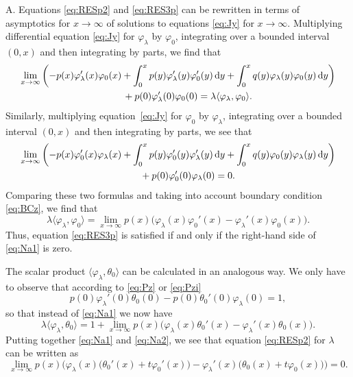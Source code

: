 \documentclass[10pt,a4paper]{amsart}
\numberwithin{equation}{section}
\begin{document}
 A. Equations \eqref{eq:RESp2} and \eqref{eq:RES3p} can be rewritten in terms of asymptotics for $x\to\infty$ of solutions to equations \eqref{eq:Jy} for $x\to\infty$.
 Multiplying differential equation \eqref{eq:Jy} for $\varphi_{\lambda}
 $ by $\varphi_{0}$, integrating over a bounded interval $(0,x)$ and then integrating by parts, we find that
 \begin{gather*}
 \lim_{x\to\infty} \bigg( {-}p(x) \varphi_{\lambda}' (x)\varphi_{0}(x)+\int_{0}^x p(y) \varphi_{\lambda}' (y)\varphi_{0}' (y)\,{\rm d}y
 +\int_{0}^x q(y) \varphi_{\lambda} (y) \varphi_{0} (y)\,{\rm d}y\bigg)
 \\
 \qquad{} + p(0) \varphi_{\lambda}' (0)\varphi_{0}(0) =\lambda\langle \varphi_{\lambda},\varphi_{0}\rangle.
 \end{gather*}
 Similarly, multiplying equation~\eqref{eq:Jy} for $\varphi_{0}$ by $\varphi_{\lambda}$, integrating over a bounded interval $(0,x)$ and then integrating by parts, we see that
 \begin{gather*}
 \lim_{x\to\infty} \bigg( {-}p(x) \varphi_{0}' (x)\varphi_{\lambda}(x)+\int_{0}^x p(y) \varphi_{0}' (y) \varphi_{\lambda}' (y)\,{\rm d}y
 +\int_{0}^x q(y) \varphi_{0} (y)\varphi_{\lambda} (y)\,{\rm d}y\bigg)
 \\
 \qquad{} + p(0) \varphi_{0}' (0)\varphi_{\lambda}(0)=0.
 \end{gather*}
 Comparing these two formulas and taking into account boundary condition \eqref{eq:BCz}, we find that
 \begin{equation}
 \lambda\langle \varphi_{\lambda},\varphi_{0}\rangle = \lim_{x\to\infty} p(x) \big( \varphi_{\lambda} (x)\varphi_{0}'(x) - \varphi_{\lambda}' (x)\varphi_{0}(x)\big).
 \label{eq:Na1}\end{equation}
 Thus, equation \eqref{eq:RES3p} is satisfied if and only if the right-hand side of \eqref{eq:Na1} is zero.

 The scalar product $\langle \varphi_{\lambda}, \theta_{0}\rangle$ can be calculated in an analogous way. We only have to observe that according to \eqref{eq:Pz} or \eqref{eq:Pzi}
 \[
 p(0) \varphi_{\lambda}'(0) \theta_{0} (0) - p(0) \theta_{0}' (0)\varphi_{\lambda}(0) =1,
 \]
 so that instead of \eqref{eq:Na1} we now have
 \begin{equation}
 \lambda\langle \varphi_{\lambda},\theta_{0}\rangle = 1+ \lim_{x\to\infty} p(x) \big( \varphi_{\lambda} (x)\theta_{0}'(x) - \varphi_{\lambda}' (x)\theta_{0}(x)\big).
 \label{eq:Na2}\end{equation}
 Putting together \eqref{eq:Na1} and \eqref{eq:Na2}, we see that equation \eqref{eq:RESp2} for $\lambda$ can be written as
 \[
 \lim_{x\to\infty} p(x) \big( \varphi_{\lambda} (x)\big(\theta_{0}'(x) + t\varphi_{0}'(x)\big)- \varphi_{\lambda}' (x) \big(\theta_{0}(x) + t\varphi_{0}(x)\big) \big)=0.
 \]
\end{document}
